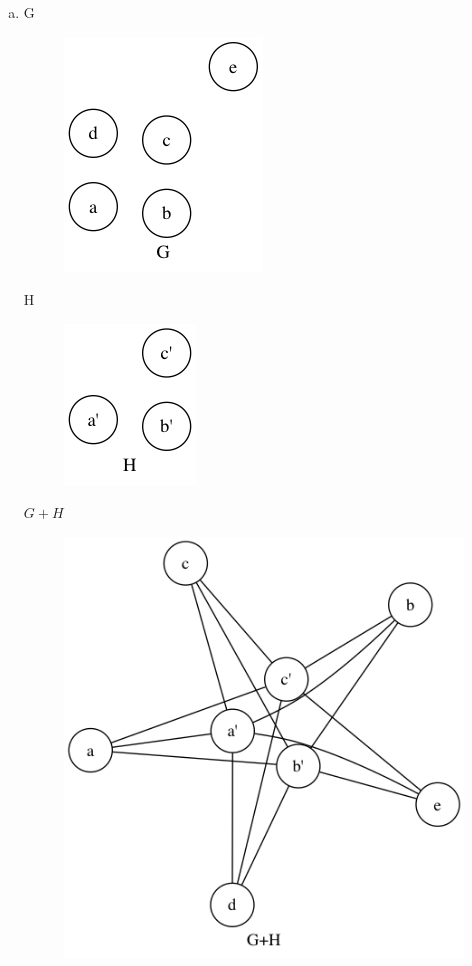 \begin{enumerate}[(a)]
    \item G 
    \begin{figure}[H]
    \centering
    \includegraphics[scale=0.5]{115/115bG.png}
    \end{figure}
    H
    \begin{figure}[H]
    \centering
    \includegraphics[scale=0.5]{115/115bH.png}
    \end{figure}
    $G+H$
    \begin{figure}[H]
    \centering
    \includegraphics[scale=0.5]{115/115bGH.png}

\end{figure}
\end{enumerate}
